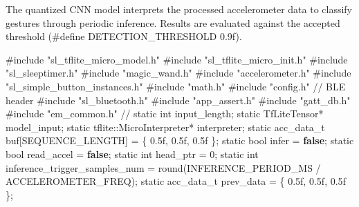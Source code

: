 \documentclass[
  9pt,
  letterpaper,
  abstract,
  titlepage]{scrbook}
\newenvironment{Shaded}{\begin{snugshade}}{\end{snugshade}}
\newcommand{\BuiltInTok}[1]{\textcolor[rgb]{0.00,0.23,0.31}{#1}}
\newcommand{\CommentTok}[1]{\textcolor[rgb]{0.37,0.37,0.37}{#1}}
\newcommand{\DataTypeTok}[1]{\textcolor[rgb]{0.68,0.00,0.00}{#1}}
\newcommand{\DecValTok}[1]{\textcolor[rgb]{0.68,0.00,0.00}{#1}}
\newcommand{\FloatTok}[1]{\textcolor[rgb]{0.68,0.00,0.00}{#1}}
\newcommand{\ImportTok}[1]{\textcolor[rgb]{0.00,0.46,0.62}{#1}}
\newcommand{\KeywordTok}[1]{\textcolor[rgb]{0.00,0.23,0.31}{\textbf{#1}}}
\newcommand{\NormalTok}[1]{\textcolor[rgb]{0.00,0.23,0.31}{#1}}
\newcommand{\OperatorTok}[1]{\textcolor[rgb]{0.37,0.37,0.37}{#1}}
\newcommand{\PreprocessorTok}[1]{\textcolor[rgb]{0.68,0.00,0.00}{#1}}
\begin{document}
The quantized CNN model interprets the processed accelerometer data to
classify gestures through periodic inference. Results are evaluated
against the accepted threshold (\#define DETECTION\_THRESHOLD 0.9f).

\begin{Shaded}
\begin{Highlighting}[]
\PreprocessorTok{\#include }\ImportTok{"sl\_tflite\_micro\_model.h"}
\PreprocessorTok{\#include }\ImportTok{"sl\_tflite\_micro\_init.h"}
\PreprocessorTok{\#include }\ImportTok{"sl\_sleeptimer.h"}
\PreprocessorTok{\#include }\ImportTok{"magic\_wand.h"}
\PreprocessorTok{\#include }\ImportTok{"accelerometer.h"}
\PreprocessorTok{\#include }\ImportTok{"sl\_simple\_button\_instances.h"}
\PreprocessorTok{\#include }\ImportTok{"math.h"}
\PreprocessorTok{\#include }\ImportTok{"config.h"}
\CommentTok{// BLE header}
\PreprocessorTok{\#include }\ImportTok{"sl\_bluetooth.h"}
\PreprocessorTok{\#include }\ImportTok{"app\_assert.h"}
\PreprocessorTok{\#include }\ImportTok{"gatt\_db.h"}
\PreprocessorTok{\#include }\ImportTok{"em\_common.h"}
\CommentTok{//}
\DataTypeTok{static} \DataTypeTok{int}\NormalTok{ input\_length}\OperatorTok{;}
\DataTypeTok{static}\NormalTok{ TfLiteTensor}\OperatorTok{*}\NormalTok{ model\_input}\OperatorTok{;}
\DataTypeTok{static}\NormalTok{ tflite}\OperatorTok{::}\NormalTok{MicroInterpreter}\OperatorTok{*}\NormalTok{ interpreter}\OperatorTok{;}
\DataTypeTok{static}\NormalTok{ acc\_data\_t buf}\OperatorTok{[}\NormalTok{SEQUENCE\_LENGTH}\OperatorTok{]} \OperatorTok{=} \OperatorTok{\{} \FloatTok{0.5}\BuiltInTok{f}\OperatorTok{,} \FloatTok{0.5}\BuiltInTok{f}\OperatorTok{,} \FloatTok{0.5}\BuiltInTok{f} \OperatorTok{\};}
\DataTypeTok{static} \DataTypeTok{bool}\NormalTok{ infer }\OperatorTok{=} \KeywordTok{false}\OperatorTok{;}
\DataTypeTok{static} \DataTypeTok{bool}\NormalTok{ read\_accel }\OperatorTok{=} \KeywordTok{false}\OperatorTok{;}
\DataTypeTok{static} \DataTypeTok{int}\NormalTok{ head\_ptr }\OperatorTok{=} \DecValTok{0}\OperatorTok{;}
\DataTypeTok{static} \DataTypeTok{int}\NormalTok{ inference\_trigger\_samples\_num }\OperatorTok{=}\NormalTok{ round}\OperatorTok{(}\NormalTok{INFERENCE\_PERIOD\_MS }\OperatorTok{/}\NormalTok{ ACCELEROMETER\_FREQ}\OperatorTok{);}
\DataTypeTok{static}\NormalTok{ acc\_data\_t prev\_data }\OperatorTok{=} \OperatorTok{\{} \FloatTok{0.5}\BuiltInTok{f}\OperatorTok{,} \FloatTok{0.5}\BuiltInTok{f}\OperatorTok{,} \FloatTok{0.5}\BuiltInTok{f} \OperatorTok{\};}


\end{Highlighting}
\end{Shaded}
\end{document}
